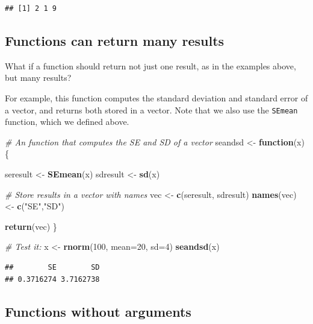 \documentclass[]{book}
\newenvironment{Shaded}{\begin{snugshade}}{\end{snugshade}}
\newcommand{\CommentTok}[1]{\textcolor[rgb]{0.56,0.35,0.01}{\textit{#1}}}
\newcommand{\ControlFlowTok}[1]{\textcolor[rgb]{0.13,0.29,0.53}{\textbf{#1}}}
\newcommand{\DataTypeTok}[1]{\textcolor[rgb]{0.13,0.29,0.53}{#1}}
\newcommand{\DecValTok}[1]{\textcolor[rgb]{0.00,0.00,0.81}{#1}}
\newcommand{\KeywordTok}[1]{\textcolor[rgb]{0.13,0.29,0.53}{\textbf{#1}}}
\newcommand{\NormalTok}[1]{#1}
\newcommand{\StringTok}[1]{\textcolor[rgb]{0.31,0.60,0.02}{#1}}
\begin{document}
\begin{verbatim}
## [1] 2 1 9
\end{verbatim}

\hypertarget{functions-can-return-many-results}{%
\subsection{Functions can return many results}\label{functions-can-return-many-results}}

What if a function should return not just one result, as in the examples above, but many results?

For example, this function computes the standard deviation and standard error of a vector, and returns both stored in a vector. Note that we also use the \texttt{SEmean} function, which we defined above.

\begin{Shaded}
\begin{Highlighting}[]
\CommentTok{# An function that computes the SE and SD of a vector}
\NormalTok{seandsd <-}\StringTok{ }\ControlFlowTok{function}\NormalTok{(x)\{}
  
\NormalTok{  seresult <-}\StringTok{ }\KeywordTok{SEmean}\NormalTok{(x)}
\NormalTok{  sdresult <-}\StringTok{ }\KeywordTok{sd}\NormalTok{(x)}

  \CommentTok{# Store results in a vector with names}
\NormalTok{  vec <-}\StringTok{ }\KeywordTok{c}\NormalTok{(seresult, sdresult)}
  \KeywordTok{names}\NormalTok{(vec) <-}\StringTok{ }\KeywordTok{c}\NormalTok{(}\StringTok{"SE"}\NormalTok{,}\StringTok{"SD"}\NormalTok{)}

\KeywordTok{return}\NormalTok{(vec)}
\NormalTok{\}}

\CommentTok{# Test it:}
\NormalTok{x <-}\StringTok{ }\KeywordTok{rnorm}\NormalTok{(}\DecValTok{100}\NormalTok{, }\DataTypeTok{mean=}\DecValTok{20}\NormalTok{, }\DataTypeTok{sd=}\DecValTok{4}\NormalTok{)}
\KeywordTok{seandsd}\NormalTok{(x)}
\end{Highlighting}
\end{Shaded}

\begin{verbatim}
##        SE        SD 
## 0.3716274 3.7162738
\end{verbatim}

\hypertarget{functions-without-arguments}{%
\subsection{Functions without arguments}\label{functions-without-arguments}}
\end{document}
